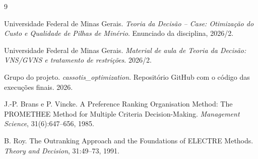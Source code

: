 \documentclass[10pt,twocolumn,a4paper]{article}
\begin{document}


{\small
\begin{thebibliography}{9}

Universidade Federal de Minas Gerais. \textit{Teoria da Decisão -- Case: Otimização do Custo e Qualidade de Pilhas de Minério}. Enunciado da disciplina, 2026/2.

Universidade Federal de Minas Gerais. \textit{Material de aula de Teoria da Decisão: VNS/GVNS e tratamento de restrições}. 2026/2.

Grupo do projeto. \textit{cassotis\_optimization}. Repositório GitHub com o código das execuções finais. 2026.

J.-P. Brans e P. Vincke. A Preference Ranking Organisation Method: The PROMETHEE Method for Multiple Criteria Decision-Making. \textit{Management Science}, 31(6):647--656, 1985.

B. Roy. The Outranking Approach and the Foundations of ELECTRE Methods. \textit{Theory and Decision}, 31:49--73, 1991.

\end{thebibliography}
}
\end{document}

